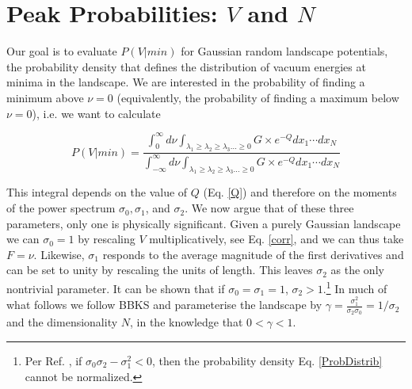 \documentclass[12pt]{article}
\newcommand{\re}[1]{\textcolor{blue}{[{\bf RE}: #1]}}
\newcommand{\lfl}[1]{\textcolor{red}{[{\bf LL}: #1]}}
\begin{document}
\section{Peak Probabilities: $V$ and $N$} \label{PeakNumbers}

Our goal  is to evaluate $P(V|min)$ for  Gaussian random landscape potentials, the probability density that defines the distribution of vacuum energies at minima in the landscape. We are interested in the probability of finding a minimum above $\nu = 0$ (equivalently, the probability of finding a maximum below $\nu = 0$), i.e. we want to calculate

\begin{equation} \label{PminIntegral}
P(V|min) =  \frac{\int^\infty_0 d\nu \int_{\lambda_1 \geq \lambda_2 \geq \lambda_3 \ldots \geq 0} G \times e^{-Q} dx_1  \cdots dx_N}{\int^\infty_{-\infty} d\nu \int_{\lambda_1 \geq \lambda_2 \geq \lambda_3 \ldots \geq 0} G \times e^{-Q} dx_1  \cdots dx_N}
\end{equation}

This integral depends on the value of $Q$ (Eq. \ref{Q})  and therefore on the moments of the power spectrum $\sigma_0, \sigma_1$,  and $\sigma_2$. We now argue that of these three parameters, only one is physically significant. Given a purely Gaussian landscape we can $\sigma_0=1$ by rescaling $V$ multiplicatively, see Eq. \ref{corr}, and we can thus take $F = \nu$. Likewise, $\sigma_1$ responds to the average magnitude of the first derivatives and can be set to unity by rescaling the units of length. This leaves $\sigma_2$ as the only nontrivial parameter. It can be shown that if $\sigma_0=\sigma_1=1$, $\sigma_2>1$.\footnote{Per Ref. \cite{Yamada2018}, if $\sigma_0\sigma_2 - \sigma_1^2 < 0$, then the probability density Eq. \ref{ProbDistrib} cannot be normalized.} In much of what follows we follow BBKS and parameterise the landscape by $\gamma = \frac{\sigma_1^2}{\sigma_2 \sigma_0}=1/\sigma_2$ and the dimensionality $N$,  in the knowledge that $0<\gamma<1$.

\end{document}
